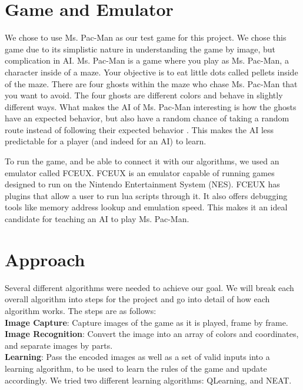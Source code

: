 \documentclass[12pt,journal,compsoc]{IEEEtran}
\begin{document}
\section{Game and Emulator}
We chose to use Ms. Pac-Man as our test game for this project. We chose this game due to its simplistic nature in understanding the game by image, but complication in AI. Ms. Pac-Man is a game where you play as Ms. Pac-Man, a character inside of a maze. Your objective is to eat little dots called pellets inside of the maze. There are four ghosts within the maze who chase Ms. Pac-Man that you want to avoid. The four ghosts are different colors and behave in slightly different ways. What makes the AI of Ms. Pac-Man interesting is how the ghosts have an expected behavior, but also have a random chance of taking a random route instead of following their expected behavior \cite{3}. This makes the AI less predictable for a player (and indeed for an AI) to learn.

To run the game, and be able to connect it with our algorithms, we used an emulator called FCEUX. FCEUX is an emulator capable of running games designed to run on the Nintendo Entertainment System (NES). FCEUX has plugins that allow a user to run lua scripts through it. It also offers debugging tools like memory address lookup and emulation speed. This makes it an ideal candidate for teaching an AI to play Ms. Pac-Man.

\section{Approach}
Several different algorithms were needed to achieve our goal. We will break each overall algorithm into steps for the project and go into detail of how each algorithm works. The steps are as follows:\\
\textbf{Image Capture}: Capture images of the game as it is played, frame by frame.\\
\textbf{Image Recognition}: Convert the image into an array of colors and coordinates, and separate images by parts.\\
\textbf{Learning}: Pass the encoded images as well as a set of valid inputs into a learning algorithm, to be used to learn the rules of the game and update accordingly. We tried two different learning algorithms: QLearning, and NEAT.
\end{document}
